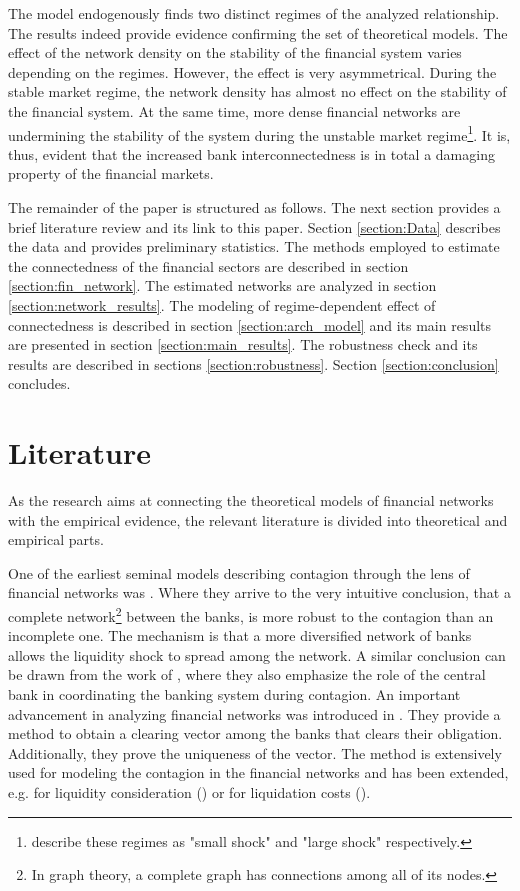 \documentclass[12pt]{article}
\begin{document}
The model endogenously finds two distinct regimes of the analyzed relationship. The results indeed provide evidence confirming the set of theoretical models. The effect of the network density on the stability of the financial system varies depending on the regimes. However, the effect is very asymmetrical. During the stable market regime, the network density has almost no effect on the stability of the financial system. At the same time, more dense financial networks are undermining the stability of the system during the unstable market regime\footnote{\cite{acemoglu13} describe these regimes as "small shock" and "large shock" respectively.}. It is, thus, evident that the increased bank interconnectedness is in total a damaging property of the financial markets. 

The remainder of the paper is structured as follows. The next section provides a brief literature review and its link to this paper. Section \ref{section:Data} describes the data and provides preliminary statistics. The methods employed to estimate the connectedness of the financial sectors are described in section \ref{section:fin_network}. The estimated networks are analyzed in section \ref{section:network_results}. The modeling of regime-dependent effect of connectedness is described in section \ref{section:arch_model} and its main results are presented in section \ref{section:main_results}. The robustness check and its results are described in sections \ref{section:robustness}. Section \ref{section:conclusion} concludes.

\section{Literature}\label{section:literature}

As the research aims at connecting the theoretical models of financial networks with the empirical evidence, the relevant literature is divided into theoretical and empirical parts.

One of the earliest seminal models describing contagion through the lens of financial networks was \cite{allen00}. Where they arrive to the very intuitive conclusion, that a complete network\footnote{In graph theory, a complete graph has connections among all of its nodes.} between the banks, is more robust to the contagion than an incomplete one. The mechanism is that a more diversified network of banks allows the liquidity shock to spread among the network. A similar conclusion can be drawn from the work of \cite{freixas00}, where they also emphasize the role of the central bank in coordinating the banking system during contagion. An important advancement in analyzing financial networks was introduced in \cite{eisenberg01}. They provide a method to obtain a clearing vector among the banks that clears their obligation. Additionally, they prove the uniqueness of the vector. The method is extensively used for modeling the contagion in the financial networks and has been extended, e.g. for liquidity consideration (\cite{cifuentes05}) or for liquidation costs (\cite{rogers13}). 
\end{document}
